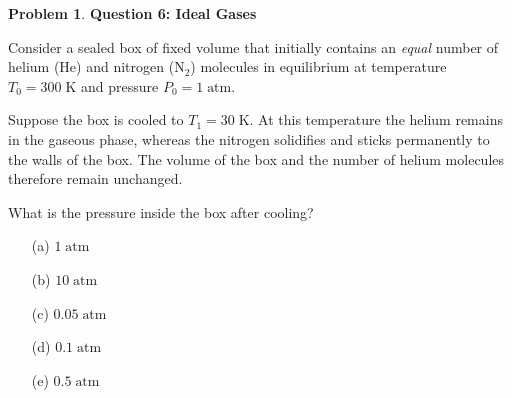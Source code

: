 \documentclass[10pt]{article}
\theoremstyle{definition} %
\newtheorem{problem}{Problem}
\theoremstyle{plain} %
\begin{document}
                                    \begin{problem}
                                      \textbf{Question 6: Ideal Gases}
                                      
                                      Consider a sealed box of fixed volume that initially contains an \emph{equal}
                                      number of helium (\(\mathrm{He}\)) and nitrogen (\(\mathrm{N_{2}}\)) molecules
                                      in equilibrium at temperature \(T_{0}=300\;\text{K}\) and pressure
                                      \(P_{0}=1\;\text{atm}\).
                                      
                                      \medskip
                                      Suppose the box is cooled to \(T_{1}=30\;\text{K}\).
                                      At this temperature the helium remains in the gaseous phase, whereas the
                                      nitrogen solidifies and sticks permanently to the walls of the box.
                                      The volume of the box and the number of helium molecules therefore remain
                                      unchanged.
                                      
                                      \smallskip
                                      What is the pressure inside the box after cooling?
                                      
                                      \begin{enumerate}
                                        \item[(a)] \(1\;\text{atm}\)
                                        \item[(b)] \(10\;\text{atm}\)
                                        \item[(c)] \(0.05\;\text{atm}\)
                                        \item[(d)] \(0.1\;\text{atm}\)
                                        \item[(e)] \(0.5\;\text{atm}\)
                                      \end{enumerate}
                                      \end{problem}
\end{document}
